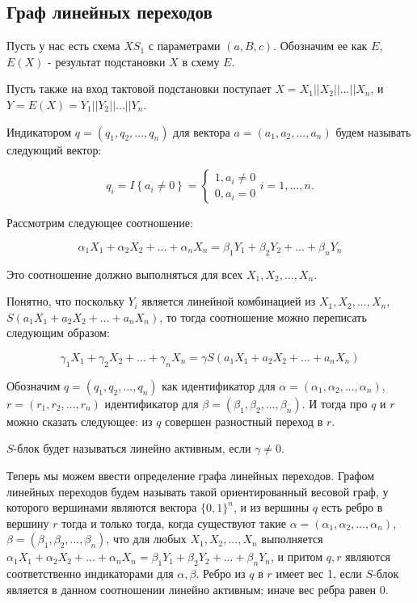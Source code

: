 \documentclass[a4paper,12pt]{extarticle}
\theoremstyle{plain} %
\begin{document}
\begin{large}
\newpage
\section{Граф линейных переходов}

Пусть у нас есть схема $XS_1$ с параметрами $(a, B, c)$. Обозначим ее как $E$,  $E(X)$ - результат подстановки $X$ в схему $E$. 

Пусть также на вход тактовой подстановки поступает $X = X_1||X_2||...||X_n$, и $Y=E(X) = Y_1||Y_2||...||Y_n$.

Индикатором $q = (q_1, q_2, ..., q_n)$ для вектора $a=(a_1, a_2, ..., a_n)$ будем называть следующий вектор:

\begin{equation}
q_i=I\left\{a_i\ne 0\right\}=\left\{ \begin{array}{c}
1,a_i \neq 0 \\
0,a_i = 0\end{array}
\right.i=1,\dots , n.
\end{equation}

Рассмотрим следующее соотношение:

\begin{equation}
\label{eq:lin_proportion}
\alpha_1X_1 + \alpha_2X_2 + ... + \alpha_nX_n = \beta_1Y_1 + \beta_2Y_2 + ... + \beta_nY_n
\end{equation}

Это соотношение должно выполняться для всех $X_1, X_2, ..., X_n$.

Понятно, что поскольку $Y_i$ является линейной комбинацией из $X_1, X_2, ..., X_n$, $S(a_1X_1 + a_2X_2 + ... + a_nX_n)$, то тогда соотношение можно переписать следующим образом:

\begin{equation}\label{eq:in_gamma}
\gamma_1X_1 + \gamma_2X_2 + ... + \gamma_nX_n = \gamma S(a_1X_1 + a_2X_2 + ... + a_nX_n)\end{equation}

Обозначим $q=(q_1, q_2, ..., q_n)$ как идентификатор для $\alpha=(\alpha_1, \alpha_2, ..., \alpha_n)$, $r=(r_1, r_2, ..., r_n)$ идентификатор для $\beta = (\beta_1, \beta_2, ..., \beta_n)$. И тогда про $q$ и $r$ можно сказать следующее: из $q$ совершен разностный переход в $r$. 

$S$-блок будет называться линейно активным, если $\gamma \neq 0$.

Теперь мы можем ввести определение графа линейных переходов. Графом линейных переходов будем называть такой ориентированный весовой граф, у которого вершинами являются вектора $\{0, 1\}^n$, и из вершины $q$ есть ребро в вершину $r$ тогда и только тогда, когда существуют такие $\alpha = (\alpha_1, \alpha_2, ..., \alpha_n)$, $\beta = (\beta_1, \beta_2, ..., \beta_n)$, что для любых $X_1, X_2, ..., X_n$ выполняется $\alpha_1X_1 + \alpha_2X_2 + ... + \alpha_nX_n = \beta_1Y_1 + \beta_2Y_2 + ... + \beta_nY_n$, и притом $q, r$ являются соответственно индикаторами для $\alpha, \beta$. Ребро из $q$ в $r$ имеет вес 1, если $S$-блок является в данном соотношении линейно активным; иначе вес ребра равен 0.


\end{large}
\end{document}
